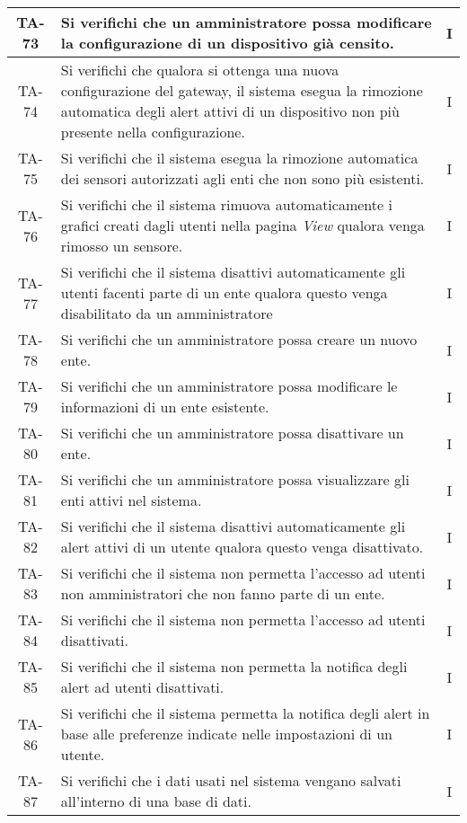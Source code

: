 \begin{center}
\begin{longtable}{|c|p{10cm}|c|}
			 \hline
			 TA-73 & Si verifichi che un amministratore possa modificare la configurazione di un dispositivo già censito. & I \\
			 \hline
			 TA-74 & Si verifichi che qualora si ottenga una nuova configurazione del gateway, il sistema esegua la rimozione automatica degli alert attivi di un dispositivo non più presente nella configurazione. & I \\
			 \hline
			 TA-75 & Si verifichi che il sistema esegua la rimozione automatica dei sensori autorizzati agli enti che non sono più esistenti. & I \\
			 \hline
			 TA-76 & Si verifichi che il sistema rimuova automaticamente i grafici creati dagli utenti nella pagina \textit{View} qualora venga rimosso un sensore. & I \\
			 \hline
			 TA-77 & Si verifichi che il sistema disattivi automaticamente gli utenti facenti parte di un ente qualora questo venga disabilitato da un amministratore & I \\
			 \hline
			 TA-78 & Si verifichi che un amministratore possa creare un nuovo ente. & I \\
			 \hline
			 TA-79 & Si verifichi che un amministratore possa modificare le informazioni di un ente esistente. & I \\
			 \hline
			 TA-80 & Si verifichi che un amministratore possa disattivare un ente. & I \\
			 \hline
			 TA-81 & Si verifichi che un amministratore possa visualizzare gli enti attivi nel sistema. & I \\
			 \hline
			 TA-82 & Si verifichi che il sistema disattivi automaticamente gli alert attivi di un utente qualora questo venga disattivato. & I \\
			 \hline
			 TA-83 & Si verifichi che il sistema non permetta l'accesso ad utenti non amministratori che non fanno parte di un ente. & I \\
			 \hline
			 TA-84 & Si verifichi che il sistema non permetta l'accesso ad utenti disattivati. & I \\
			 \hline
			 TA-85 & Si verifichi che il sistema non permetta la notifica degli alert ad utenti disattivati. & I \\
			 \hline
			 TA-86 & Si verifichi che il sistema permetta la notifica degli alert in base alle preferenze indicate nelle impostazioni di un utente. & I \\
			 \hline
			 TA-87 & Si verifichi che i dati usati nel sistema vengano salvati all'interno di una base di dati. & I \\

\end{longtable}
\end{center}
